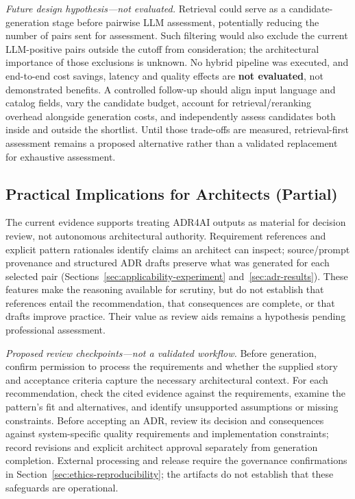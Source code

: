 \emph{Future design hypothesis---not evaluated.}
Retrieval could serve as a candidate-generation stage before pairwise
LLM assessment, potentially reducing the number of pairs sent for
assessment. Such filtering would also exclude the current LLM-positive
pairs outside the cutoff from consideration; the architectural importance
of those exclusions is unknown. No hybrid pipeline was executed, and
end-to-end cost savings, latency and quality effects are
\textbf{not evaluated}, not demonstrated benefits.
A controlled follow-up should align input language and catalog fields,
vary the candidate budget, account for retrieval/reranking overhead
alongside generation costs, and independently assess candidates both
inside and outside the shortlist. Until those trade-offs are measured,
retrieval-first assessment remains a proposed alternative rather than
a validated replacement for exhaustive assessment.

\subsection{Practical Implications for Architects (Partial)}
\label{sec:practitioner-implications}

The current evidence supports treating ADR4AI outputs as material for
decision review, not autonomous architectural authority.
Requirement references and explicit pattern rationales identify claims
an architect can inspect; source/prompt provenance and structured ADR
drafts preserve what was generated for each selected pair
(Sections~\ref{sec:applicability-experiment} and~\ref{sec:adr-results}).
These features make the reasoning available for scrutiny, but do not
establish that references entail the recommendation, that consequences
are complete, or that drafts improve practice. Their value as review aids
remains a hypothesis pending professional assessment.

\emph{Proposed review checkpoints---not a validated workflow.}
Before generation, confirm permission to process the requirements and
whether the supplied story and acceptance criteria capture the necessary
architectural context. For each recommendation, check the cited evidence
against the requirements, examine the pattern's fit and alternatives,
and identify unsupported assumptions or missing constraints.
Before accepting an ADR, review its decision and consequences against
system-specific quality requirements and implementation constraints;
record revisions and explicit architect approval separately from
generation completion. External processing and release require the
governance confirmations in Section~\ref{sec:ethics-reproducibility};
the artifacts do not establish that these safeguards are operational.

